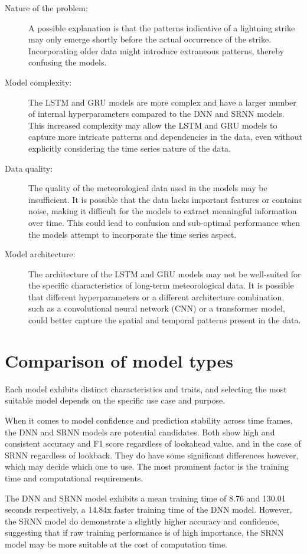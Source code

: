 \begin{description}
	\item[Nature of the problem:] A possible explanation is that the patterns indicative of a lightning strike may only emerge shortly before the actual occurrence of the strike. Incorporating older data might introduce extraneous patterns, thereby confusing the models.
	\item[Model complexity:] The LSTM and GRU models are more complex and have a larger number of internal hyperparameters compared to the DNN and SRNN models. This increased complexity may allow the LSTM and GRU models to capture more intricate patterns and dependencies in the data, even without explicitly considering the time series nature of the data.
	\item[Data quality:] The quality of the meteorological data used in the models may be insufficient. It is possible that the data lacks important features or contains noise, making it difficult for the models to extract meaningful information over time. This could lead to confusion and sub-optimal performance when the models attempt to incorporate the time series aspect.
	\item[Model architecture:] The architecture of the LSTM and GRU models may not be well-suited for the specific characteristics of long-term meteorological data. It is possible that different hyperparameters or a different architecture combination, such as a convolutional neural network (CNN) or a transformer model, could better capture the spatial and temporal patterns present in the data.
\end{description}

\section{Comparison of model types}

Each model exhibits distinct characteristics and traits, and selecting the most suitable model depends on the specific use case and purpose.

When it comes to model confidence and prediction stability across time frames, the DNN and SRNN models are potential candidates. Both show high and consistent accuracy and F1 score regardless of lookahead value, and in the case of SRNN regardless of lookback. They do have some significant differences however, which may decide which one to use. The most prominent factor is the training time and computational requirements.

The DNN and SRNN model exhibits a mean training time of 8.76 and 130.01 seconds respectively, a 14.84x faster training time of the DNN model. However, the SRNN model do demonstrate a slightly higher accuracy and confidence, suggesting that if raw training performance is of high importance, the SRNN model may be more suitable at the cost of computation time.

